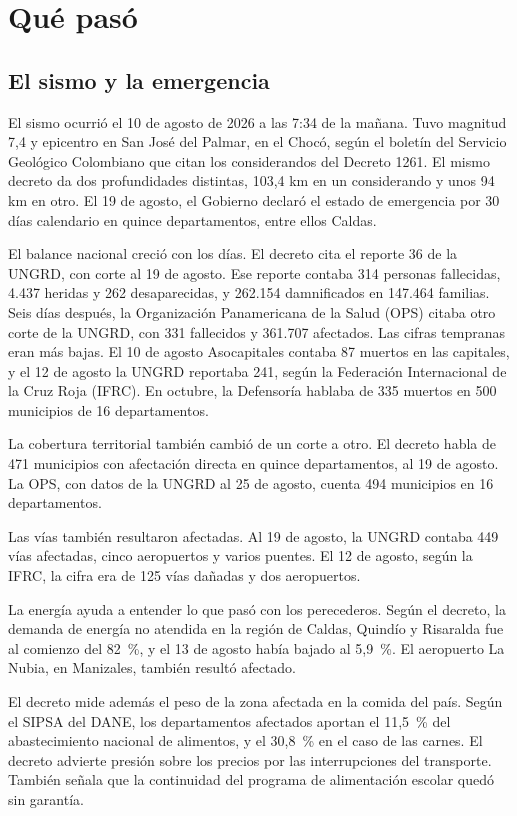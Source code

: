 \section{Qué pasó}

\subsection{El sismo y la emergencia}

El sismo ocurrió el 10 de agosto de 2026 a las 7:34 de la mañana. Tuvo magnitud 7,4 y epicentro en San José del Palmar, en el Chocó, según el boletín del Servicio Geológico Colombiano que citan los considerandos del Decreto 1261. El mismo decreto da dos profundidades distintas, 103,4 km en un considerando y unos 94 km en otro. El 19 de agosto, el Gobierno declaró el estado de emergencia por 30 días calendario en quince departamentos, entre ellos Caldas.

El balance nacional creció con los días. El decreto cita el reporte 36 de la UNGRD, con corte al 19 de agosto. Ese reporte contaba 314 personas fallecidas, 4.437 heridas y 262 desaparecidas, y 262.154 damnificados en 147.464 familias. Seis días después, la Organización Panamericana de la Salud (OPS) citaba otro corte de la UNGRD, con 331 fallecidos y 361.707 afectados. Las cifras tempranas eran más bajas. El 10 de agosto Asocapitales contaba 87 muertos en las capitales, y el 12 de agosto la UNGRD reportaba 241, según la Federación Internacional de la Cruz Roja (IFRC). En octubre, la Defensoría hablaba de 335 muertos en 500 municipios de 16 departamentos.

La cobertura territorial también cambió de un corte a otro. El decreto habla de 471 municipios con afectación directa en quince departamentos, al 19 de agosto. La OPS, con datos de la UNGRD al 25 de agosto, cuenta 494 municipios en 16 departamentos.

Las vías también resultaron afectadas. Al 19 de agosto, la UNGRD contaba 449 vías afectadas, cinco aeropuertos y varios puentes. El 12 de agosto, según la IFRC, la cifra era de 125 vías dañadas y dos aeropuertos.

La energía ayuda a entender lo que pasó con los perecederos. Según el decreto, la demanda de energía no atendida en la región de Caldas, Quindío y Risaralda fue al comienzo del 82~\%, y el 13 de agosto había bajado al 5,9~\%. El aeropuerto La Nubia, en Manizales, también resultó afectado.

El decreto mide además el peso de la zona afectada en la comida del país. Según el SIPSA del DANE, los departamentos afectados aportan el 11,5~\% del abastecimiento nacional de alimentos, y el 30,8~\% en el caso de las carnes. El decreto advierte presión sobre los precios por las interrupciones del transporte. También señala que la continuidad del programa de alimentación escolar quedó sin garantía.

